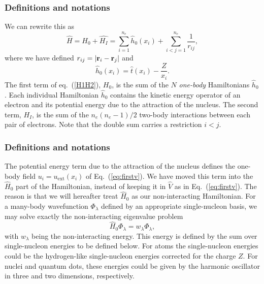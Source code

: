 \documentclass[compress]{beamer}
\begin{document}
\frame
{
  \frametitle{Definitions and notations}
\begin{small}
{\scriptsize
 We can rewrite this as
\begin{equation}
    \hat{H} = \hat{H_0} + \hat{H_I} 
    = \sum_{i=1}^{n_e}\hat{h}_0(x_i) + \sum_{i<j=1}^{n_e}\frac{1}{r_{ij}},
\label{H1H2}
\end{equation}
where  we have defined $r_{ij}=| {\bf r}_i-{\bf r}_j|$ and
\begin{equation}
  \hat{h}_0(x_i) =  \hat{t}(x_i) - \frac{Z}{x_i}.
\label{hi}
\end{equation}
The first term of eq.~(\ref{H1H2}), $H_0$, is the sum of the $N$
\emph{one-body} Hamiltonians $\hat{h}_0$. Each individual
Hamiltonian $\hat{h}_0$ contains the kinetic energy operator of an
electron and its potential energy due to the attraction of the
nucleus. The second term, $H_I$, is the sum of the $n_e(n_e-1)/2$
two-body interactions between each pair of electrons. Note that the double sum carries a restriction $i<j$.
}
\end{small}
}

\frame
{
  \frametitle{Definitions and notations}
\begin{small}
{\scriptsize
The potential energy term due to the attraction of the nucleus defines the one-body field $u_i=u_{\mathrm{ext}}(x_i)$ of Eq.~(\ref{eq:firstv}).
We have moved this term into the $\hat{H}_0$ part of the Hamiltonian, instead of keeping  it in $\hat{V}$ as in  Eq.~(\ref{eq:firstv}).
The reason is that we will hereafter treat $\hat{H}_0$ as our non-interacting  Hamiltonian. For a many-body wavefunction $\Phi_{\lambda}$ defined by an  
appropriate single-nucleon basis, we may solve exactly the non-interacting eigenvalue problem 
\[
\hat{H}_0\Phi_{\lambda}= w_{\lambda}\Phi_{\lambda},
\]
with $w_{\lambda}$ being the non-interacting energy. This energy is defined by the sum over single-nucleon energies to be defined below.
For atoms the single-nucleon energies could be the hydrogen-like single-nucleon energies corrected for the charge $Z$. For nuclei and quantum
dots, these energies could be given by the harmonic oscillator in three and two dimensions, respectively.
}
\end{small}
}
\end{document}
